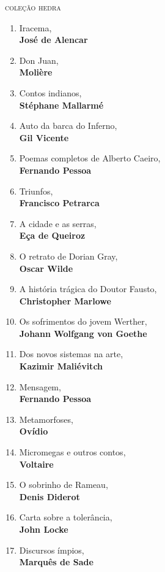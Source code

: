 \ifodd\thepage\paginabranca\else\clearpage\fi
\pagestyle{empty}

\begingroup
\scriptsize
{\large\textsc{coleção hedra}}\\
\begin{enumerate} [font=\Formular\scriptsize]
\setlength\parskip{8pt}
\setlength\itemsep{-1.4mm}
\item Iracema,\\ \textbf{José de Alencar}
\item Don Juan,\\ \textbf{Molière}
\item Contos indianos,\\ \textbf{Stéphane Mallarmé}
\item Auto da barca do Inferno,\\ \textbf{Gil Vicente}
\item Poemas completos de Alberto Caeiro,\\ \textbf{Fernando Pessoa}
\item Triunfos,\\ \textbf{Francisco Petrarca}
\item A cidade e as serras,\\ \textbf{Eça de Queiroz}
\item O retrato de Dorian Gray,\\ \textbf{Oscar Wilde}
\item A história trágica do Doutor Fausto,\\ \textbf{Christopher Marlowe}
\item Os sofrimentos do jovem Werther,\\ \textbf{Johann Wolfgang von Goethe}
\item Dos novos sistemas na arte,\\ \textbf{Kazimir Maliévitch}
\item Mensagem,\\ \textbf{Fernando Pessoa}
\item Metamorfoses,\\ \textbf{Ovídio}
\item Micromegas e outros contos,\\ \textbf{Voltaire}
\item O sobrinho de Rameau,\\ \textbf{Denis Diderot}
\item Carta sobre a tolerância,\\ \textbf{John Locke}
\item Discursos ímpios,\\ \textbf{Marquês de Sade}

\end{enumerate}
